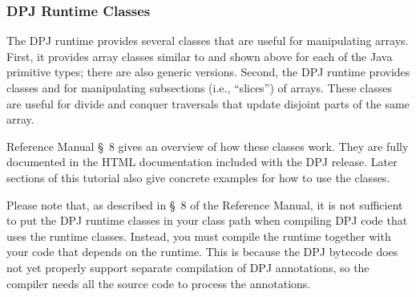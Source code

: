 \subsubsection{DPJ Runtime Classes
\label{sec:arrays:runtime}}

The DPJ runtime provides several classes that are useful for
manipulating arrays.  First, it provides array classes similar to
 and  shown above for each of the Java
primitive types; there are also generic versions.  Second, the DPJ
runtime provides classes  and  for
manipulating subsections (i.e., ``slices'') of arrays.  These classes
are useful for divide and conquer traversals that update disjoint
parts of the same array.

Reference Manual \S~8 gives an overview of how these classes work.
They are fully documented in the HTML documentation included with the
DPJ release.  Later sections of this tutorial also give concrete
examples for how to use the classes.

Please note that, as described in \S~8 of the Reference Manual, it is
not sufficient to put the DPJ runtime classes in your class path when
compiling DPJ code that uses the runtime classes.  Instead, you must
compile the runtime together with your code that depends on the
runtime.  This is because the DPJ bytecode does not yet properly
support separate compilation of DPJ annotations, so the compiler needs
all the source code to process the annotations.
%

